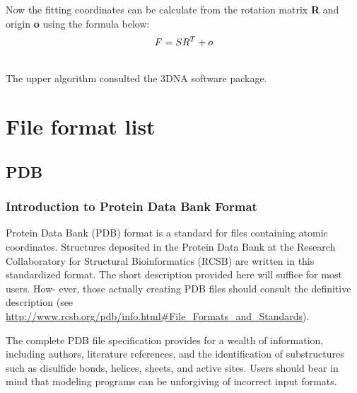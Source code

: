\documentclass[letterpaper,10pt,english]{sphinxmanual}
\begin{document}
Now the fitting coordinates can be calculate from the rotation matrix \textbf{R} and origin \textbf{o} using the formula below:
\begin{gather}
\begin{split}F=SR^T+o\end{split}\notag\\\begin{split}\end{split}\notag
\end{gather}
The upper algorithm consulted the 3DNA software package.


\chapter{File format list}
\label{documentation_pages/file_format::doc}\label{documentation_pages/file_format:file-format-list}

\section{PDB}
\label{documentation_pages/file_format:pdb}

\subsection{Introduction to Protein Data Bank Format}
\label{documentation_pages/file_format:introduction-to-protein-data-bank-format}
Protein Data Bank (PDB) format is a standard for files containing atomic coordinates. Structures
deposited in the Protein Data Bank at the Research Collaboratory for Structural Bioinformatics (RCSB) are
written in this standardized format. The short description provided here will suffice for most users. How-
ever, those actually creating PDB files should consult the definitive description (see
\href{http://www.rcsb.org/pdb/info.html\#File\_Formats\_and\_Standards}{http://www.rcsb.org/pdb/info.html\#File\_Formats\_and\_Standards}).

The complete PDB file specification provides for a wealth of information, including authors, literature
references, and the identification of substructures such as disulfide bonds, helices, sheets, and active
sites. Users should bear in mind that modeling programs can be unforgiving of incorrect input formats.
\end{document}
